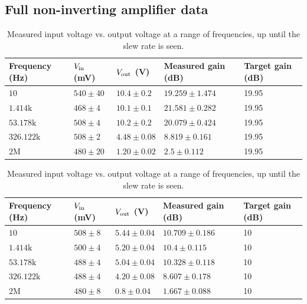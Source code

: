 \documentclass[11pt]{article}
\begin{document}
\subsection{Full non-inverting amplifier data}

\begin{table}[H]
	\centering
	\begin{tabular}{|l|l|l|l|l|}
	\hline
	Frequency (Hz)    & $V_{\rm in}$ (mV) & $V_{\rm out}$ (V) & Measured gain (dB) & Target gain (dB) \\
	\hline
	$10$              & $540 \pm 40$     & $10.4 \pm 0.2$    & $19.259 \pm 1.474$ & 19.95            \\
	$1.414\text{k}$   & $468 \pm 4$      & $10.1 \pm 0.1$    & $21.581 \pm 0.282$ & 19.95            \\
	$53.178\text{k}$  & $508 \pm 4$      & $10.2 \pm 0.2$    & $20.079 \pm 0.424$ & 19.95            \\
	$326.122\text{k}$ & $508 \pm 2$      & $4.48 \pm 0.08$   & $8.819 \pm 0.161$  & 19.95            \\
	$2\text{M}$       & $480 \pm 20$     & $1.20 \pm 0.02$   & $2.5 \pm 0.112$    & 19.95            \\
	\hline
	\end{tabular}
	\caption{Measured input voltage vs. output voltage at a range of
	frequencies, up until the slew rate is seen.}
\end{table}

\begin{table}[H]
	\centering
	\begin{tabular}{|l|l|l|l|l|}
	\hline
	Frequency (Hz)    & $V_{\rm in}$ (mV) & $V_{\rm out}$ (V) & Measured gain (dB) & Target gain (dB) \\
	\hline
	$10$              & $508 \pm 8$      & $5.44 \pm 0.04$   & $10.709 \pm 0.186$ & 10               \\
	$1.414\text{k}$   & $500 \pm 4$      & $5.20 \pm 0.04$   & $10.4 \pm 0.115$   & 10               \\
	$53.178\text{k}$  & $488 \pm 4$      & $5.04 \pm 0.04$   & $10.328 \pm 0.118$ & 10               \\
	$326.122\text{k}$ & $488 \pm 4$      & $4.20 \pm 0.08$   & $8.607 \pm 0.178$  & 10               \\
	$2\text{M}$       & $480 \pm 8$      & $0.8 \pm 0.04$    & $1.667 \pm 0.088$  & 10               \\
	\hline
	\end{tabular}
	\caption{Measured input voltage vs. output voltage at a range of
	frequencies, up until the slew rate is seen.}
\end{table}
\end{document}
